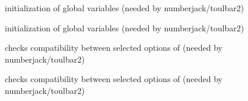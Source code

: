 \documentclass[letterpaper,10pt,openany,oneside,english]{sphinxmanual}
\begin{document}
\begin{fulllineitems}
\label{\detokenize{ref/ref_cpp:_CPPv47tb2initv}}\label{\detokenize{ref/ref_cpp:_CPPv37tb2initv}}\label{\detokenize{ref/ref_cpp:_CPPv27tb2initv}}\label{\detokenize{ref/ref_cpp:tb2init}}
\pysigstartsignatures
\pysigstartmultiline
{}
\pysigstopmultiline
\pysigstopsignatures
\sphinxAtStartPar
initialization of {\hyperref[\detokenize{ref/ref_cpp:classToulBar2}]{}} global variables (needed by numberjack/toulbar2) 

\sphinxAtStartPar
initialization of {\hyperref[\detokenize{ref/ref_cpp:classToulBar2}]{}} global variables (needed by numberjack/toulbar2) 

\end{fulllineitems}


\begin{fulllineitems}
\label{\detokenize{ref/ref_cpp:_CPPv415tb2checkOptionsv}}\label{\detokenize{ref/ref_cpp:_CPPv315tb2checkOptionsv}}\label{\detokenize{ref/ref_cpp:_CPPv215tb2checkOptionsv}}\label{\detokenize{ref/ref_cpp:tb2checkOptions}}
\pysigstartsignatures
\pysigstartmultiline
{}
\pysigstopmultiline
\pysigstopsignatures
\sphinxAtStartPar
checks compatibility between selected options of {\hyperref[\detokenize{ref/ref_cpp:classToulBar2}]{}} (needed by numberjack/toulbar2) 

\sphinxAtStartPar
checks compatibility between selected options of {\hyperref[\detokenize{ref/ref_cpp:classToulBar2}]{}} (needed by numberjack/toulbar2) 

\end{fulllineitems}




\renewcommand{\indexname}{Index}
\printindex
\end{document}
